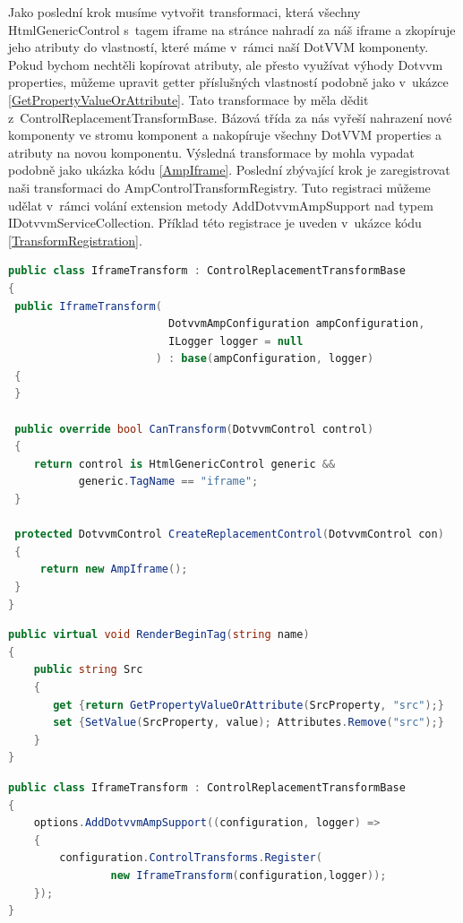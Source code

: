 Jako poslední krok musíme vytvořit transformaci, která všechny HtmlGenericControl s~tagem iframe na stránce nahradí za náš iframe a zkopíruje jeho atributy do vlastností, které máme v~rámci naší DotVVM komponenty. Pokud bychom nechtěli kopírovat atributy, ale přesto využívat výhody Dotvvm properties, můžeme upravit getter příslušných vlastností podobně jako v~ukázce \ref{GetPropertyValueOrAttribute}.  Tato transformace by měla dědit z~ControlReplacementTransformBase. Bázová třída za nás vyřeší nahrazení nové komponenty ve stromu komponent a nakopíruje všechny DotVVM properties a atributy na novou komponentu. Výsledná transformace by mohla vypadat podobně jako ukázka kódu  \ref{AmpIframe}. Poslední zbývající krok je zaregistrovat naši transformaci do AmpControlTransformRegistry. Tuto registraci můžeme udělat v~rámci volání extension metody AddDotvvmAmpSupport nad typem IDotvvmServiceCollection. Příklad této registrace je uveden v~ukázce kódu \ref{TransformRegistration}.
\begin{lstlisting}[language=c#, caption=Ukázka možné implementace tranformace pro iframe,label=AmpIframe,captionpos=t]
public class IframeTransform : ControlReplacementTransformBase
{
 public IframeTransform(
                         DotvvmAmpConfiguration ampConfiguration,
                         ILogger logger = null
                       ) : base(ampConfiguration, logger)
 {
 }

 public override bool CanTransform(DotvvmControl control)
 {
    return control is HtmlGenericControl generic &&
           generic.TagName == "iframe";
 }

 protected DotvvmControl CreateReplacementControl(DotvvmControl con)
 {
     return new AmpIframe();
 }
}
\end{lstlisting}

\begin{lstlisting}[language=c#, caption=Možný způsob jak se vyhnout kopírování HTML atributů do DotVVM property. ,label=GetPropertyValueOrAttribute,captionpos=t]
public virtual void RenderBeginTag(string name)
{
    public string Src
    {
       get {return GetPropertyValueOrAttribute(SrcProperty, "src");}
       set {SetValue(SrcProperty, value); Attributes.Remove("src");}
    }
}
\end{lstlisting}

    \begin{lstlisting}[language=c#, caption=Ukázka možné implementace tranformace pro iframe,label=TransformRegistration,captionpos=t]
public class IframeTransform : ControlReplacementTransformBase
{
    options.AddDotvvmAmpSupport((configuration, logger) =>
    {
        configuration.ControlTransforms.Register(
                new IframeTransform(configuration,logger));
    });
}
\end{lstlisting}


